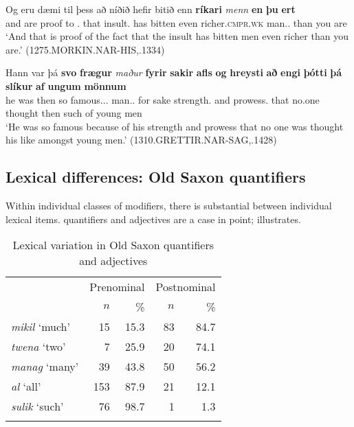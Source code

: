 \documentclass[output=paper,colorlinks,citecolor=brown,draft]{langscibook}
\begin{document}
\ea\label{OIpostcompdisc}
\gll Og eru dæmi til þess að níðið hefir bitið enn \textbf{ríkari} \textit{menn} \textbf{en} \textbf{þu} \textbf{ert}\\
and are proof to \DEM.\GEN{} that insult.\DEF{} has bitten even richer.\textsc{cmpr.wk} man.\ACC.\PL{} than you are\\
\glt ‘And that is proof of the fact that the insult has bitten men even richer than you are.’ (1275.MORKIN.NAR-HIS,.1334)
\z

\ea\label{OIpostcompdisc2}
\gll Hann var þá \textbf{svo} \textbf{frægur} \textit{maður} \textbf{fyrir} \textbf{sakir} \textbf{afls} \textbf{og} \textbf{hreysti} \textbf{að} \textbf{engi} \textbf{þótti} \textbf{þá} \textbf{slíkur} \textbf{af} 	\textbf{ungum} \textbf{mönnum}\\
	he was then so famous.\NOM.\SG.\STR{} man.\NOM.\SG{} for sake strength.\GEN{} and prowess.\GEN{} that no.one thought then such of young men\\
\glt ‘He was so famous because of his strength and prowess that no one was thought his like amongst young men.’ (1310.GRETTIR.NAR-SAG,.1428)
\z

\subsection{Lexical differences: Old Saxon quantifiers}\label{OSLexDiff}
Within individual classes of modifiers, there is substantial  between individual lexical items.  quantifiers and adjectives are a case in point;  illustrates.

\begin{table}
\caption{Lexical variation in Old Saxon quantifiers and adjectives}
\label{tabOSLexDiff}
 \begin{tabular}{l rrrr}
  \lsptoprule
  & \multicolumn{2}{r}{Prenominal} & \multicolumn{2}{r}{Postnominal}\\\cmidrule(lr){2-3}\cmidrule(lr){4-5}
  & $n$ & \% & $n$ & \%\\  \midrule
  \textit{mikil} ‘much’ & 15 & 15.3 & 83 & 84.7\\
 \textit{twena} ‘two’ & 7 & 25.9 & 20 & 74.1\\
 \textit{manag} ‘many’ & 39 & 43.8 & 50 & 56.2\\
 \textit{al} ‘all’ & 153 & 87.9 & 21 & 12.1\\
 \textit{sulik} ‘such’ & 76 & 98.7 & 1 & 1.3\\
 \lspbottomrule
 \end{tabular}
\end{table}
\end{document}
